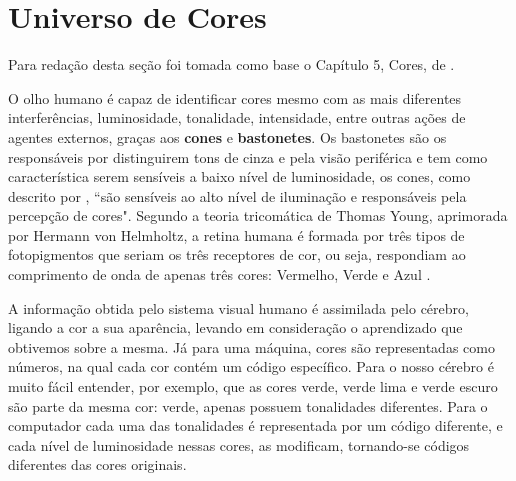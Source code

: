 \section{Universo de Cores} \label{Sec:Cores}

Para redação desta seção foi tomada como base o Capítulo 5, Cores, de .

O olho humano é capaz de identificar cores mesmo com as mais diferentes interferências, luminosidade, tonalidade, intensidade, entre outras ações de agentes externos, graças aos \textbf{cones} e \textbf{bastonetes}. Os bastonetes são os responsáveis por distinguirem tons de cinza e pela visão periférica e tem como característica serem sensíveis a baixo nível de luminosidade, os cones, como descrito por , ``são sensíveis ao alto nível de iluminação e responsáveis pela percepção de cores". Segundo a teoria tricomática de Thomas Young, aprimorada por Hermann von Helmholtz, a retina humana é formada por três tipos de fotopigmentos que seriam os três receptores de cor, ou seja, respondiam ao comprimento de onda de apenas três cores: Vermelho, Verde e Azul \cite{Azevedo:2003}. 

A informação obtida pelo sistema visual humano é assimilada pelo cérebro, ligando a cor a sua aparência, levando em consideração o aprendizado que obtivemos sobre a mesma. Já para uma máquina, cores são representadas como números, na qual cada cor contém um código específico. Para o nosso cérebro é muito fácil entender, por exemplo, que as cores verde, verde lima e verde escuro são parte da mesma cor: verde, apenas possuem tonalidades diferentes. Para o computador cada uma das tonalidades é representada por um código diferente, e cada nível de luminosidade nessas cores, as modificam, tornando-se códigos diferentes das cores originais.



